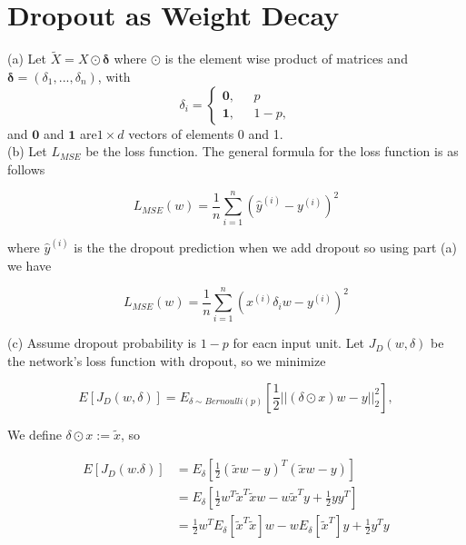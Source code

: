 \documentclass{amsart}
\theoremstyle{definition}
\theoremstyle{remark}
\numberwithin{equation}{section}
\begin{document}
\section{Dropout as Weight Decay}
(a) Let $\tilde{X}=X\odot\bm{\delta}$ where $\odot$ is the element wise product of matrices and
$\bm{\delta}=(\delta_1,...,\delta_n)$, with
\begin{equation}
\delta_i=
\begin{cases}
\bm{0}, ~~~&p  \\
\bm{1}, &1-p,
\end{cases}
\end{equation}
and $\bm{0}$ and $\bm{1}$ are$1\times d$ vectors of elements 0 and 1.\\

(b) Let $L_{MSE}$ be the loss function. The general formula for the loss function is as follows

\begin{equation}
L_{MSE}(w) = \frac{1}{n}\sum_{i=1}^n(\hat{y}^{(i)}-y^{(i)})^2
\end{equation}

where $\hat{y}^{(i)}$ is the the dropout prediction when we add dropout so using part (a) we have

\begin{equation}
\label{MSE}
L_{MSE}(w) =\frac{1}{n}\sum_{i=1}^n(x^{(i)}\delta_i w-y^{(i)})^2
\end{equation}

(c) Assume dropout probability is $1-p$ for eacn input unit. Let $J_D(w, \delta)$
be the network's loss function with dropout, so we minimize

$$E\left[J_D(w,\delta)\right]= E_{\delta\sim Bernoulli(p)}\left[ \frac{1}{2}||(\delta\odot x)w-y||_2^2\right],$$

We define $\delta\odot x:= \tilde{x}$, so

\begin{equation}
\begin{split}
E\left[J_D(w.\delta)\right]&= E_\delta \left[\frac{1}{2}\left( \tilde{x}w-y\right)^T \left(\tilde{x}w-y \right) \right]\\
&= E_\delta \left[ \frac{1}{2}w^T\tilde{x}^T \tilde{x}w -w\tilde{x}^T y +\frac{1}{2}yy^T\right]\\
&= \frac{1}{2}w^T E_\delta\left[ \tilde{x}^T \tilde{x} \right]w-w E_\delta[\tilde{x}^T]y +\frac{1}{2}y^Ty\\
\end{split}
\end{equation}
\end{document}
